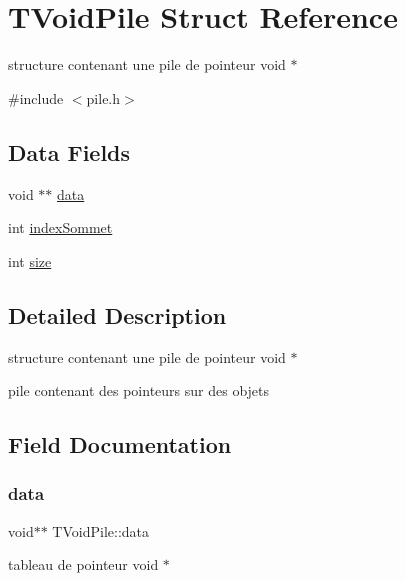 \hypertarget{structTVoidPile}{}\section{T\+Void\+Pile Struct Reference}
\label{structTVoidPile}


structure contenant une pile de pointeur void $\ast$  




{\ttfamily \#include $<$pile.\+h$>$}

\subsection*{Data Fields}
\begin{DoxyCompactItemize}
\item 
void $\ast$$\ast$ \hyperlink{structTVoidPile_acca3cd1682326b767142e204d1b5d0eb}{data}
\item 
int \hyperlink{structTVoidPile_a4ec92ed494b0e73198d9dbc81818fb91}{index\+Sommet}
\item 
int \hyperlink{structTVoidPile_a1c5535f494a3c080f0ee15e615105895}{size}
\end{DoxyCompactItemize}


\subsection{Detailed Description}
structure contenant une pile de pointeur void $\ast$ 

pile contenant des pointeurs sur des objets 

\subsection{Field Documentation}
\mbox{\label{structTVoidPile_acca3cd1682326b767142e204d1b5d0eb}} 
\subsubsection{\texorpdfstring{data}{data}}
{\footnotesize\ttfamily void$\ast$$\ast$ T\+Void\+Pile\+::data}

tableau de pointeur void $\ast$ \mbox{\label{structTVoidPile_a4ec92ed494b0e73198d9dbc81818fb91}} 
